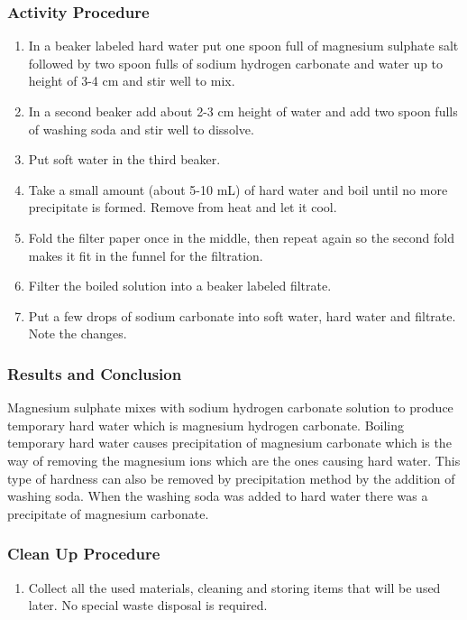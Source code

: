 \subsubsection*{Activity Procedure}
\begin{enumerate}
\item{In a beaker labeled hard water put one spoon full of magnesium sulphate salt followed by two spoon fulls of sodium hydrogen carbonate and water up to height of 3-4 cm and stir well to mix.}
\item{In a second beaker add about 2-3 cm height of water and add two spoon fulls of washing soda and stir well to dissolve.}
\item{Put soft water in the third beaker.}
\item{Take a small amount (about 5-10 mL) of hard water and boil until no more precipitate is formed. Remove from heat and let it cool.}
\item{Fold the filter paper once in the middle, then repeat again so the second fold makes it fit in the funnel for the filtration.}
\item{Filter the boiled solution into a beaker labeled filtrate.}
\item{Put a few drops of sodium carbonate into soft water, hard water and filtrate. Note the changes.}
\end{enumerate}

\subsubsection*{Results and Conclusion}
Magnesium sulphate mixes with sodium hydrogen carbonate solution to produce temporary hard water which is magnesium hydrogen carbonate. Boiling temporary hard water causes precipitation of magnesium carbonate which is the way of removing the magnesium ions which are the ones causing hard water. This type of hardness can also be removed by precipitation method by the addition of washing soda. When the washing soda was added to hard water there was a precipitate of magnesium carbonate.

\subsubsection*{Clean Up Procedure}
\begin{enumerate}
\item{Collect all the used materials, cleaning and storing items that will be used later. No special waste disposal is required.}
\end{enumerate}

